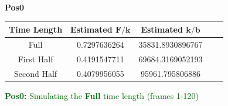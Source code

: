 \documentclass[12pt]{article}
\begin{document}
\clearpage






\vspace*{1in}
{\LARGE \textbf{Pos0}}
\vspace{.5in}
\begin{table}[h!]
    \begin{center}
    \Large
	\renewcommand{\arraystretch}{1.3}
        \begin{tabular}{|c|c|c|c|c|}
            \hline
		\textbf{Time Length} & \textbf{Estimated} $\boldsymbol F/\boldsymbol k$ & \textbf{Estimated} $\boldsymbol k/\boldsymbol b$ \\ \hline
		Full & 0.7297636264 & 35831.8930896767 \\ \hline
		First Half & 0.4191547711 & 69684.3169052193 \\ \hline
		Second Half & 0.4079956055 & 95961.795806886 \\ \hline
        \end{tabular}
     \end{center}
\end{table}

\clearpage

\noindent \textcolor{DarkGreen}{\textbf{Pos0:} Simulating the \textbf{Full} time length (frames 1-120)}
\end{document}
